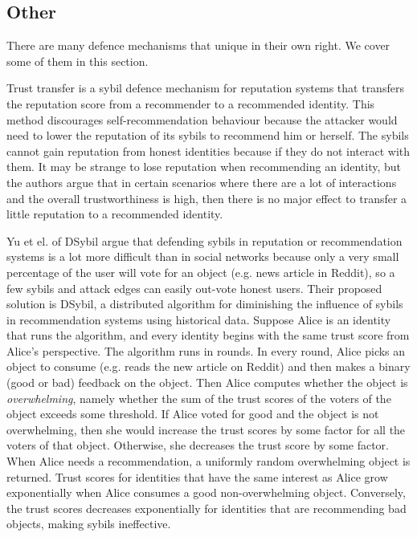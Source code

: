 
\subsection{Other}
There are many defence mechanisms that unique in their own right. We cover some
of them in this section.

Trust transfer\cite{seigneur2005trust} is a sybil defence mechanism for
reputation systems that transfers the reputation score from a recommender to a
recommended identity. This method discourages self-recommendation behaviour
because the attacker would need to lower the reputation of its sybils to
recommend him or herself. The sybils cannot gain reputation from honest
identities because if they do not interact with them. It may be strange to lose
reputation when recommending an identity, but the authors argue that in certain
scenarios where there are a lot of interactions and the overall trustworthiness
is high, then there is no major effect to transfer a little reputation to
a recommended identity.

Yu et el. of DSybil\cite{yu2009dsybil} argue that defending sybils in reputation
or recommendation systems is a lot more difficult than in social networks
because only a very small percentage of the user will vote for an object (e.g.
news article in Reddit), so a few sybils and attack edges can easily out-vote
honest users. Their proposed solution is DSybil, a distributed algorithm for
diminishing the influence of sybils in recommendation systems using historical
data. Suppose Alice is an identity that runs the algorithm, and every identity
begins with the same trust score from Alice's perspective. The algorithm runs in
rounds. In every round, Alice picks an object to consume (e.g. reads the new
article on Reddit) and then makes a binary (good or bad) feedback on the object.
Then Alice computes whether the object is \emph{overwhelming}, namely whether
the sum of the trust scores of the voters of the object exceeds some threshold.
If Alice voted for good and the object is not overwhelming, then she would
increase the trust scores by some factor for all the voters of that object.
Otherwise, she decreases the trust score by some factor. When Alice needs a
recommendation, a uniformly random overwhelming object is returned. Trust scores
for identities that have the same interest as Alice grow exponentially when
Alice consumes a good non-overwhelming object. Conversely, the trust scores
decreases exponentially for identities that are recommending bad objects, making
sybils ineffective.


